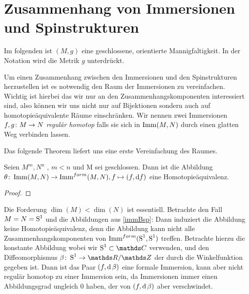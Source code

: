 


\section{Zusammenhang von Immersionen und Spinstrukturen}

Im folgenden ist $(M,g)$ eine geschlossene, orientierte Mannigfaltigkeit.
In der Notation wird die Metrik $g$ unterdrückt.


Um einen Zusammenhang zwischen den Immersionen und den Spinstrukturen
herzustellen ist es notwendig den Raum der Immersionen zu
vereinfachen.  Wichtig ist hierbei das wir nur an den
Zusammenhangskomponenten interessiert sind, also können wir uns nicht
nur auf Bijektionen sondern auch auf homotopieäquivalente Räume
einschränken.  Wir nennen zwei Immersionen $ \abb{f,g}{M}{N} $
\textit{regulär homotop} falls sie sich in $ \Imm{M}{N} $ durch einen
glatten Weg verbinden lassen.

 Das folgende Theorem liefert uns eine erste Vereinfachung des Raumes. 
\begin{Thm}
	Seien $M^m,N^n$ \mfgen, $m<n$ und M sei geschlossen. Dann ist die Abbildung
	$\abb{\theta}{\Imm{M}{N}}{\Immf{M}{N}}, f \mapsto (f,\mathrm{d} f)$ eine Homotopieäquivalenz.
\begin{proof}
\end{proof}

\end{Thm}

\begin{Bsp}
	Die Forderung $ \dim(M)<\dim(N) $ ist essentiell. Betrachte 
	den Fall $ M=N=\S^1 $ und die Abbildungen aus \cref{immBsp}:
	Dann induziert die Abbildung 
	keine Homotopieäquivalenz, denn die Abbildung kann
	nicht alle Zusammenhangskomponenten von $ \Immf{\S^1}{\S^1} $
	treffen. Betrachte hierzu die konstante Abbildung
	 wobei wir $ \S^1\subset\C $ 
	verwenden, und den Diffeomorphismus $ \abb{\beta}{\S^1}{\R / \Z} $
	der durch die Winkelfunktion gegeben ist. Dann ist das Paar $ (f,\d \beta) $ eine formale Immersion, kann aber nicht regulär
	homotop zu einer Immersion sein, da Immersionen immer einen 
	Abbildungsgrad ungleich $ 0 $ haben, der von $ (f,\d \beta) $ aber
	verschwindet.
\end{Bsp}

